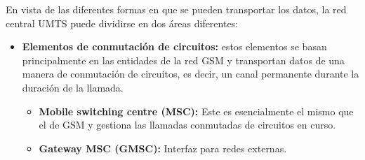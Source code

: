 \begin{itemize}
\begin{itemize}
		En vista de las diferentes formas en que se pueden transportar los datos, la red central UMTS puede dividirse en dos áreas diferentes: 
		\begin{itemize}
		\item \textbf{Elementos de conmutación de circuitos:} estos elementos se basan principalmente en las entidades de la red GSM y transportan datos de una manera de conmutación de circuitos, es decir, un canal permanente durante la duración de la llamada. \\
		\begin{itemize}
			\item \textbf{Mobile switching centre (MSC):} Este es esencialmente el mismo que el de GSM y gestiona las llamadas conmutadas de circuitos en curso.
			\item \textbf{Gateway MSC (GMSC):} Interfaz para redes externas.\\
		\end{itemize}				
		

\end{itemize}
\end{itemize}
\end{itemize}
